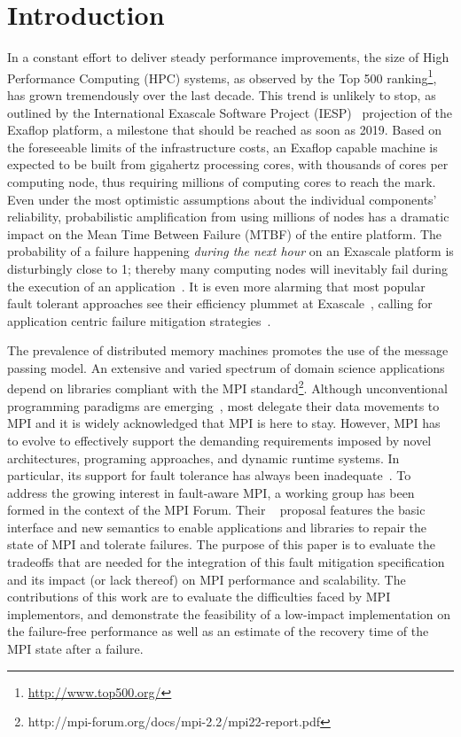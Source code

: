 \section{Introduction}
\label{sect:intro}

In a constant effort to deliver steady performance improvements, the size of
High Performance Computing (HPC) systems, as observed by the Top 500
ranking\footnote{\url{http://www.top500.org/}}, has grown tremendously over the
last decade. This trend is unlikely to stop, as outlined by the International
Exascale Software Project (IESP)~\cite{IESP} projection of the Exaflop platform,
a milestone that should be reached as soon as 2019. Based on the foreseeable
limits of the infrastructure costs, an Exaflop capable machine is expected to be
built from gigahertz processing cores, with thousands of cores per computing
node, thus requiring millions of computing cores to reach the mark. Even under
the most optimistic assumptions about the individual components' reliability,
probabilistic amplification from using millions of nodes has a dramatic impact
on the Mean Time Between Failure (MTBF) of the entire platform. The probability
of a failure happening \emph{during the next hour} on an Exascale platform is
disturbingly close to 1; thereby many computing nodes will inevitably fail
during the execution of an application~\cite{ExaScaleResilience09}.  It is even
more alarming that most popular fault tolerant approaches see their efficiency
plummet at Exascale~\cite{BOSILCA-2012-696154,lawn265}, calling for application
centric failure mitigation strategies~\cite{huang1984algorithm}.

The prevalence of distributed memory machines promotes the use of the message
passing model. An extensive and varied spectrum of domain science applications
depend on libraries compliant with the MPI
standard\footnote{http://mpi-forum.org/docs/mpi-2.2/mpi22-report.pdf}.
Although unconventional programming paradigms are
emerging~\cite{springerlink:10.1007/978-3-540-79561-2_4,springerlink:10.1007/978-3-642-19328-6_5},
most delegate their data movements to MPI and it is widely acknowledged that MPI
is here to stay. However,  MPI has to evolve to effectively support the demanding requirements
imposed by novel architectures, programing approaches, and dynamic runtime
systems.  In particular, its support for fault tolerance 
has always been inadequate~\cite{Gropp:2004:FTM:1080704.1080714}.  To address
the growing interest in fault-aware MPI, a working group has been formed in the
context of the MPI Forum. Their 
\ulfm~\cite{BlandULFMTechReport} proposal features the basic interface and new semantics to
enable applications and libraries to repair the state of MPI and tolerate failures. The purpose of this paper is to evaluate the tradeoffs that are needed for the
integration of this fault mitigation specification and its impact (or lack
thereof) on MPI performance and scalability. The contributions of this work are
to evaluate the difficulties faced by MPI implementors, and demonstrate the
feasibility of a low-impact implementation on the failure-free performance as
well as an estimate of the recovery time of the MPI state after a failure.

